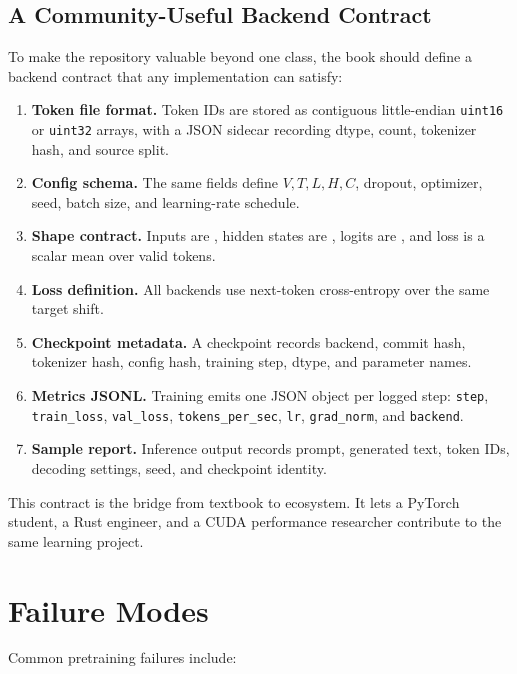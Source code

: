 \subsection{A Community-Useful Backend Contract}

To make the repository valuable beyond one class, the book should define a backend
contract that any implementation can satisfy:

\begin{enumerate}
  \item \textbf{Token file format.} Token IDs are stored as contiguous little-endian
  \texttt{uint16} or \texttt{uint32} arrays, with a JSON sidecar recording dtype, count,
  tokenizer hash, and source split.
  \item \textbf{Config schema.} The same fields define \(V,T,L,H,C\), dropout, optimizer,
  seed, batch size, and learning-rate schedule.
  \item \textbf{Shape contract.} Inputs are \shape{[B,T]}, hidden states are
  \shape{[B,T,C]}, logits are \shape{[B,T,V]}, and loss is a scalar mean over valid
  tokens.
  \item \textbf{Loss definition.} All backends use next-token cross-entropy over the same
  target shift.
  \item \textbf{Checkpoint metadata.} A checkpoint records backend, commit hash,
  tokenizer hash, config hash, training step, dtype, and parameter names.
  \item \textbf{Metrics JSONL.} Training emits one JSON object per logged step:
  \texttt{step}, \texttt{train\_loss}, \texttt{val\_loss}, \texttt{tokens\_per\_sec},
  \texttt{lr}, \texttt{grad\_norm}, and \texttt{backend}.
  \item \textbf{Sample report.} Inference output records prompt, generated text, token
  IDs, decoding settings, seed, and checkpoint identity.
\end{enumerate}

This contract is the bridge from textbook to ecosystem. It lets a PyTorch student, a Rust
engineer, and a CUDA performance researcher contribute to the same learning project.

\section{Failure Modes}

Common pretraining failures include:

